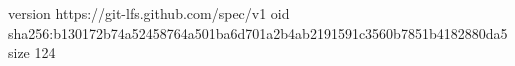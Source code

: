 version https://git-lfs.github.com/spec/v1
oid sha256:b130172b74a52458764a501ba6d701a2b4ab2191591c3560b7851b4182880da5
size 124
